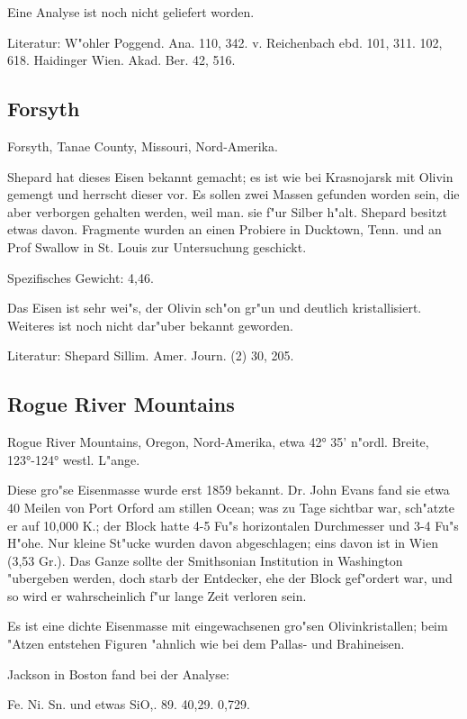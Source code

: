 \documentclass[a4paper, 11pt, oneside]{article}
\begin{document}
Eine Analyse ist noch nicht geliefert worden.

Literatur: W"ohler Poggend. Ana. 110, 342. v. Reichenbach ebd. 101, 311. 102, 618. Haidinger Wien. Akad. Ber. 42, 516.

\subsection{Forsyth}

Forsyth, Tanae County, Missouri, Nord-Amerika.

Shepard hat dieses Eisen bekannt gemacht; es ist wie bei Krasnojarsk mit Olivin gemengt und herrscht dieser vor. Es sollen zwei Massen gefunden worden sein, die aber verborgen gehalten werden, weil man. sie f"ur Silber h"alt. Shepard besitzt etwas davon. Fragmente wurden an einen Probiere in Ducktown, Tenn. und an Prof Swallow in St. Louis zur Untersuchung geschickt.

Spezifisches Gewicht: 4,46.

Das Eisen ist sehr wei"s, der Olivin sch"on gr"un und deutlich kristallisiert. Weiteres ist noch nicht dar"uber bekannt geworden.

Literatur: Shepard Sillim. Amer. Journ. (2) 30, 205.

\subsection{Rogue River Mountains}

Rogue River Mountains, Oregon, Nord-Amerika, etwa 42° 35' n"ordl. Breite, 123°-124° westl. L"ange.

Diese gro"se Eisenmasse wurde erst 1859 bekannt. Dr. John Evans fand sie etwa 40 Meilen von Port Orford am stillen Ocean; was zu Tage sichtbar war, sch"atzte er auf 10,000 K.; der Block hatte 4-5 Fu"s horizontalen Durchmesser und 3-4 Fu"s H"ohe. Nur kleine St"ucke wurden davon abgeschlagen; eins davon ist in Wien (3,53 Gr.). Das Ganze sollte der Smithsonian Institution in Washington "ubergeben werden, doch starb der Entdecker, ehe der Block gef"ordert war, und so wird er wahrscheinlich f"ur lange Zeit verloren sein.

Es ist eine dichte Eisenmasse mit eingewachsenen gro"sen Olivinkristallen; beim "Atzen entstehen Figuren "ahnlich wie bei dem Pallas- und Brahineisen.

Jackson in Boston fand bei der Analyse:

Fe. Ni. Sn. und etwas SiO,.
89. 40,29. 0,729.
\end{document}

